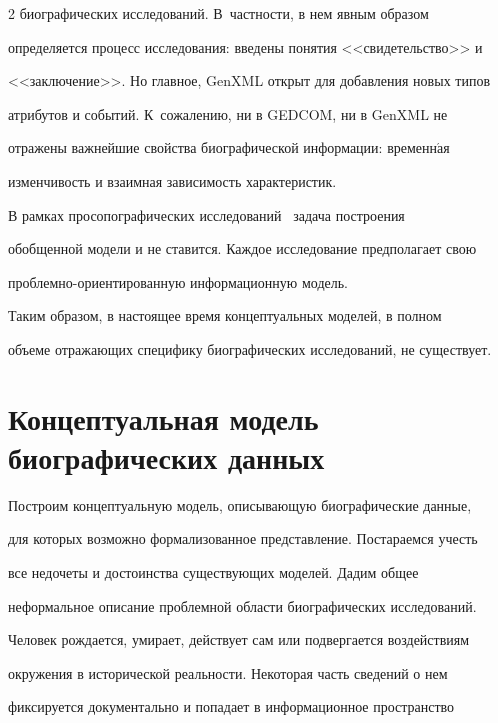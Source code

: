 \begin{multicols}{2}
биографических исследований. В~частности, в нем явным образом 


определяется процесс исследования: введены понятия <<свидетельство>> и 


<<заключение>>. Но главное, GenXML открыт для добавления новых типов 


атрибутов и событий. К~сожалению, ни в GEDCOM, ни в GenXML не 


отражены важнейшие свойства биографической информации: временн$\acute{\mbox{а}}$я 


изменчивость и взаимная зависимость характеристик. 


  


  В рамках просопографических исследований~\cite{11mar} задача построения 


обобщенной модели и не ставится. Каждое исследование предполагает свою 


проблемно-ориентированную информационную модель. 


  


  Таким образом, в настоящее время концептуальных моделей, в полном 


объеме отражающих специфику биографических исследований, не существует.





\section{Концептуальная модель биографических данных} 


  


  Построим концептуальную модель, описы\-ва\-ющую биографические данные, 


для которых возмож\-но формализованное представление. Постараемся учесть 


все недочеты и достоинства существующих моделей. Дадим общее 


неформальное описание проблемной области биографических исследований.


  


  Человек рождается, умирает, действует сам или подвергается воздействиям 


окружения в исторической реальности. Некоторая часть сведений о нем 


фиксируется документально и попадает в информационное пространство 



\end{multicols}
